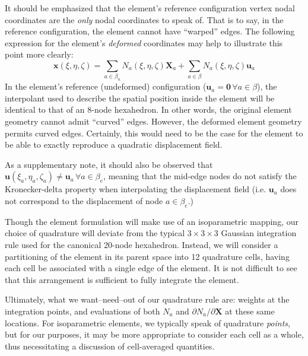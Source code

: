 \documentclass[11pt]{article} %
\begin{document}
It should be emphasized that the element's reference configuration vertex nodal coordinates are the \textit{only} nodal coordinates to speak of. That is to say, in the reference configuration, the element cannot have ``warped'' edges. The following expression for the element's \textit{deformed} coordinates may help to illustrate this point more clearly:
\begin{equation}
	\mathbf{x} (\xi, \eta, \zeta) = \sum_{a \in \beta_n} N_a (\xi, \eta, \zeta) \mathbf{X}_a + \sum_{a \in \beta} N_a (\xi, \eta, \zeta) \mathbf{u}_a
\end{equation}
In the element's reference (undeformed) configuration ($\mathbf{u}_a = \mathbf{0} \, \forall a \in \beta$), the interpolant used to describe the spatial position inside the element will be identical to that of an 8-node hexahedron. In other words, the original element geometry cannot admit ``curved'' edges. However, the deformed element geometry permits curved edges. Certainly, this would need to be the case for the element to be able to exactly reproduce a quadratic displacement field.

As a supplementary note, it should also be observed that $\mathbf{u} (\xi_a, \eta_a, \zeta_a) \neq \mathbf{u}_a \, \forall a \in \beta_e$, meaning that the mid-edge nodes do not satisfy the Kronecker-delta property when interpolating the displacement field (i.e. $\mathbf{u}_a$ does not correspond to the displacement of node $a \in \beta_e$.)

Though the element formulation will make use of an isoparametric mapping, our choice of quadrature will deviate from the typical $3 \times 3 \times 3$ Gaussian integration rule used for the canonical 20-node hexahedron. Instead, we will consider a partitioning of the element in its parent space into 12 quadrature cells, having each cell be associated with a single edge of the element. It is not difficult to see that this arrangement is sufficient to fully integrate the element.

Ultimately, what we want--need--out of our quadrature rule are: weights at the integration points, and evaluations of both $N_a$ and $\partial N_a / \partial \mathbf{X}$ at these same locations. For isoparametric elements, we typically speak of quadrature \textit{points}, but for our purposes, it may be more appropriate to consider each cell as a whole, thus necessitating a discussion of cell-averaged quantities.
\end{document}
